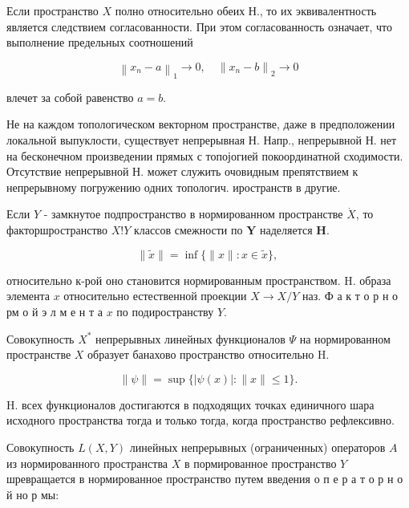\documentclass[10pt]{article}
\begin{document}
Если пространство $X$ полно относительно обеих Н., то их эквивалентность является следствием согласованности. При этом согласованность означает, что выполнение предельных соотношений



\[

\left\|x_{n}-a\right\|_{1} \rightarrow 0, \quad\left\|x_{n}-b\right\|_{2} \rightarrow 0

\]



влечет за собой равенство $a=b$.



Не на каждом топологическом векторном пространстве, даже в предположении локальной выпуклости, существует непрерывная Н. Напр., непрерывной Н. нет на бесконечном произведении прямых с топојогией покоординатной сходимости. Отсутствие непрерывной Н. может служить очовидным препятствием к непрерывному погружению одних топологич. иространств в другие.



Если $Y$ - замкнутое подпространство в нормированном пространстве $\dot{X}$, то факторшространство $X ! Y$ классов смежности по $\boldsymbol{Y}$ наделяется $\mathbf{H}$.



\[

\|\tilde{x}\|=\inf \{\|x\|: x \in \tilde{x}\} \text {, }

\]



относительно к-рой оно становится нормированным пространством. H. образа элемента $x$ относительно естественной проекции $X \rightarrow X / Y$ наз. Ф а к т о р н о рм о й э л м е н т а $x$ по подиространству $Y$.



Совокупность $X^{*}$ непрерывных линейных функционалов $\Psi$ на нормированном пространстве $X$ образует банахово пространство относительно $\mathrm{H}$.



\[

\|\psi\|=\sup \{|\psi(x)|:\|x\| \leqslant 1\} .

\]



H. всех функционалов достигаются в подходящих точках единичного шара исходного пространства тогда и только тогда, когда пространство рефлексивно.



Совокупность $L(X, Y)$ линейных непрерывных (ограниченных) операторов $A$ из нормированного пространства $X$ в пормированное пространство $Y$ шревращается в нормированное пространство путем введения о п е р а т о р н о й но р мы:
\end{document}
